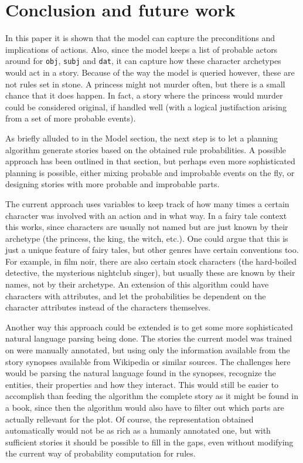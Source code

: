 \section{Conclusion and future work}

In this paper it is shown that the model can capture the preconditions and
implications of actions. Also, since the model keeps a list of probable actors
around for \texttt{obj}, \texttt{subj} and \texttt{dat},
it can capture how these character archetypes would act in a story. Because of the
way the model is queried however, these are not rules set in stone. A princess
might not murder often, but there is a small chance that it does happen. In
fact, a story where the princess would murder could be considered original, if
handled well (with a logical justifaction arising from a set of more probable
events).

As briefly alluded to in the Model section, the next step is to let a planning
algorithm generate stories based on the obtained rule probabilities. A possible
approach has been outlined in that section, but perhaps even more sophisticated
planning is possible, either mixing probable and improbable events on the fly,
or designing stories with more probable and improbable parts.

The current approach uses variables to keep track of how many times a certain
character was involved with an action and in what way. In a fairy tale context
this works, since characters are usually not named but are just known by their
archetype (the princess, the king, the witch, etc.). One could argue that this
is just a unique feature of fairy tales, but other genres have certain conventions
too. For example, in film noir, there are also certain stock characters (the
hard-boiled detective, the mysterious nightclub singer), but usually these are
known by their names, not by their archetype. An extension of this algorithm
could have characters with attributes, and let the probabilities be dependent on
the character attributes instead of the characters themselves.

Another way this approach could be extended is to get some more sophisticated
natural language parsing being done. The stories the current model was trained
on were manually annotated, but using only the information available from the
story synopses available from Wikipedia or similar sources. The challenges here
would be parsing the natural language found in the synopses, recognize the
entities, their properties and how they interact.
This would still be easier to accomplish than feeding the algorithm the complete
story as it might be found in a book, since then the algorithm would also have
to filter out which parts are actually rellevant for the plot.
Of course, the representation obtained automatically would not be as rich as a
humanly annotated one, but with sufficient stories it should be possible to fill
in the gaps, even without modifying the current way of probability computation
for rules.
